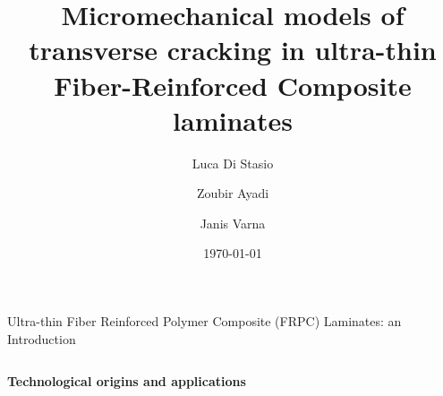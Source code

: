 \documentclass[final]{beamer}
\title{Micromechanical models of transverse cracking in ultra-thin Fiber-Reinforced Composite laminates}
\author{Luca Di Stasio \inst{1,2} \and Zoubir Ayadi \inst{1} \and Janis Varna \inst{2}}
\date{\today}
\begin{document}
\begin{frame}

\begin{center}
\begin{minipage}{\textwidth}
\begin{block}{\rule[-0.6ex]{0pt}{50pt}\centering\LARGE Ultra-thin Fiber Reinforced Polymer Composite (FRPC) Laminates: an Introduction}
\vspace{1cm}
\begin{columns}
\begin{column}{0.4\textwidth}
  \begin{center}
\textbf{Technological origins and applications}
\captionsetup[subfigure]{labelformat=empty}
\begin{figure}[!h]
\centering
   \\[40pt]
\quad
{}

\end{figure}
\end{center}
\end{column}
\end{columns}
\end{block}
\end{minipage}
\end{center}
\end{frame}
\end{document}
